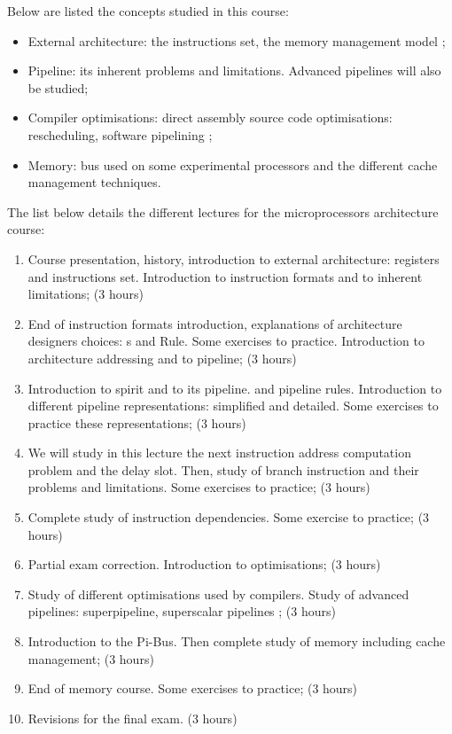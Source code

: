 \begin{multicols}{2}
Below are listed the concepts studied in this course:

\begin{itemize}
  \item
    External architecture: the instructions set, the memory management model
    \etc{};
  \item
    Pipeline: its inherent problems and limitations. Advanced pipelines will
    also be studied;
  \item
    Compiler optimisations: direct assembly source code optimisations:
    rescheduling, software pipelining \etc{};
  \item
    Memory: bus used on some experimental processors and the different cache
    management techniques.
\end{itemize}

The list below details the different lectures for the microprocessors
architecture course:

\begin{enumerate}
  \item
    Course presentation,  history, introduction to 
    external architecture: registers and instructions set. Introduction to
    instruction formats and to inherent limitations; (3 hours)
  \item
    End of instruction formats introduction, explanations of architecture
    designers choices: s and  Rule. Some exercises to
    practice. Introduction to  architecture addressing and to
     pipeline; (3 hours)
  \item
    Introduction to  spirit and to its pipeline. 
    and pipeline rules. Introduction to different pipeline representations:
    simplified and detailed. Some exercises to practice these representations;
    (3 hours)
  \item
    We will study in this lecture the next instruction address computation
    problem and the delay slot. Then, study of branch instruction and their
    problems and limitations. Some exercises to practice; (3 hours)
  \item
    Complete study of instruction dependencies. Some exercise to practice;
    (3 hours)
  \item
    Partial exam correction. Introduction to optimisations; (3 hours)
  \item
    Study of different optimisations used by compilers. Study of
    advanced pipelines: superpipeline, superscalar pipelines \etc{}; (3 hours)
  \item
    Introduction to the Pi-Bus. Then complete study of memory including
    cache management; (3 hours)
  \item
    End of memory course. Some exercises to practice; (3 hours)
  \item
    Revisions for the final exam. (3 hours)
\end{enumerate}


\end{multicols}
